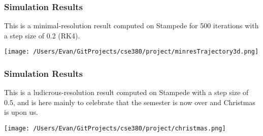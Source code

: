 \documentclass{beamer}
\begin{document}
\begin{frame}
\frametitle{Simulation Results}
This is a minimal-resolution result computed on Stampede for 500 iterations with a step size of 0.2 (RK4).

\texttt{[image: /Users/Evan/GitProjects/cse380/project/minresTrajectory3d.png]}
\end{frame}

\begin{frame}
\frametitle{Simulation Results}
This is a ludicrous-resolution result computed on Stampede with a step size of 0.5, and is here mainly to celebrate
that the semester is now over and Christmas is upon us.

\texttt{[image: /Users/Evan/GitProjects/cse380/project/christmas.png]}
\end{frame}
\end{document}
